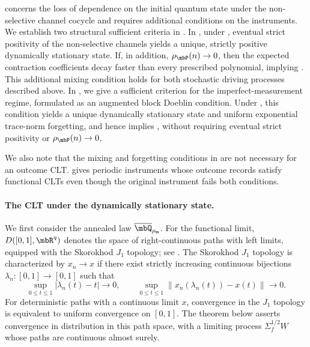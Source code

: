 \documentclass[a4paper]{article}
\numberwithin{equation}{section}   %
\theoremstyle{plain}   %
\theoremstyle{plain}   %
\theoremstyle{examplestyle}
\DeclareMathOperator{\pr}{\mbP}           %
\newcommand{\s}{\rho_{\mathsf{ss}}}     %
\newcommand{\unorm}[1]{\left\lVert#1\right\rVert}
\begin{document}
     concerns the loss of dependence on the initial quantum state under the non-selective channel cocycle and requires additional conditions on the instruments.
    We establish two structural sufficient criteria in .
    In , under , eventual strict positivity of the non-selective channels yields a unique, strictly positive dynamically stationary state.
    If, in addition, $\rho_{\pr}(n)\to0$, then the expected contraction coefficients decay faster than every prescribed polynomial, implying .
    This additional mixing condition holds for both stochastic driving processes described above.
    In , we give a sufficient criterion for the imperfect-measurement regime, formulated as an augmented block Doeblin condition.
    Under , this condition yields a unique dynamically stationary state and uniform exponential trace-norm forgetting, and hence implies , without requiring eventual strict positivity or $\rho_{\pr}(n)\to0$.

    We also note that the mixing and forgetting conditions in  are not necessary for an outcome CLT.
     gives periodic instruments whose outcome records satisfy functional CLTs even though the original instrument fails both conditions.

    \paragraph{The CLT under the dynamically stationary state.}
        We first consider the annealed law $\overline\mbQ_{\s}$.
        For the functional limit, $D([0,1],\mbR^q)$ denotes the space of right-continuous paths with left limits, equipped with the Skorokhod $J_1$ topology; see \cite{Billingsley_1999}.
        The Skorokhod $J_1$ topology is characterized by $x_n\to x$ if there exist strictly increasing continuous bijections $\lambda_n:[0,1]\to[0,1]$ such that
        \[
             \sup_{0\le t\le1}|\lambda_n(t)-t|\longrightarrow0,
             \qquad
             \sup_{0\le t\le1}\unorm{x_n(\lambda_n(t))-x(t)}\longrightarrow0.
        \]
        For deterministic paths with a continuous limit $x$, convergence in the $J_1$ topology is equivalent to uniform convergence on $[0,1]$.
        The theorem below asserts convergence in distribution in this path space, with a limiting process $\Sigma_f^{1/2}W$ whose paths are continuous almost surely.
\end{document}
